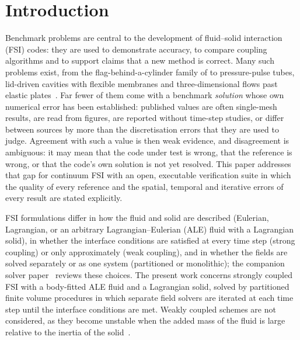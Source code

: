 \section{Introduction}\label{sec:intro}
Benchmark problems are central to the development of fluid--solid interaction (FSI) codes: they are used to demonstrate accuracy, to compare coupling algorithms and to support claims that a new method is correct.
Many such problems exist, from the flag-behind-a-cylinder family of \citet{Turek2006} to pressure-pulse tubes, lid-driven cavities with flexible membranes and three-dimensional flows past elastic plates~\citep{Richter2012, Failer2020}.
Far fewer of them come with a benchmark \emph{solution} whose own numerical error has been established: published values are often single-mesh results, are read from figures, are reported without time-step studies, or differ between sources by more than the discretisation errors that they are used to judge.
Agreement with such a value is then weak evidence, and disagreement is ambiguous: it may mean that the code under test is wrong, that the reference is wrong, or that the code's own solution is not yet resolved.
This paper addresses that gap for continuum FSI with an open, executable verification suite in which the quality of every reference and the spatial, temporal and iterative errors of every result are stated explicitly.

FSI formulations differ in how the fluid and solid are described (Eulerian, Lagrangian, or an arbitrary Lagrangian--Eulerian (ALE) fluid with a Lagrangian solid), in whether the interface conditions are satisfied at every time step (strong coupling) or only approximately (weak coupling), and in whether the fields are solved separately or as one system (partitioned or monolithic); the companion solver paper~\citep{CardiffBatistic2026QM} reviews these choices.
The present work concerns strongly coupled FSI with a body-fitted ALE fluid and a Lagrangian solid, solved by partitioned finite volume procedures in which separate field solvers are iterated at each time step until the interface conditions are met.
Weakly coupled schemes are not considered, as they become unstable when the added mass of the fluid is large relative to the inertia of the solid~\citep{Causin2005, Forster2006}.

